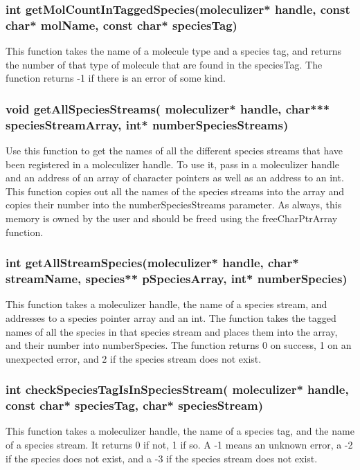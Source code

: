 \subsubsection{int getMolCountInTaggedSpecies(moleculizer* handle,
  const char* molName, const char* speciesTag)}
This function takes the name of a molecule type and a species tag, and
returns the number of that type of molecule that are found in the
speciesTag.  The function returns -1 if there is an error of some
kind.  

\subsubsection{void getAllSpeciesStreams( moleculizer* handle, char***
  speciesStreamArray, int* numberSpeciesStreams)}
Use this function to get the names of all the different species
streams that have been registered in a moleculizer handle.  To use it,
pass in a moleculizer handle and an address of an array of character
pointers as well as an address to an int.  This function copies out
all the names of the species streams into the array and copies their
number into the numberSpeciesStreams parameter.  As always, this
memory is owned by the user and should be freed using the
freeCharPtrArray function.  


\subsubsection{int getAllStreamSpecies(moleculizer* handle, char*
  streamName, species** pSpeciesArray, int* numberSpecies)}
This function takes a moleculizer handle, the name of a species
stream, and addresses to a species pointer array and an int.  The
function takes the tagged names of all the species in that species
stream and places them into the array, and their number into
numberSpecies.  The function returns 0 on success, 1 on an unexpected
error, and 2 if the species stream does not exist.  

\subsubsection{int checkSpeciesTagIsInSpeciesStream( moleculizer*
  handle, const char* speciesTag, char* speciesStream)}
This function takes a moleculizer handle, the name of a species
tag, and the name of a species stream.  It returns 0 if not, 1 if so.
A -1 means an unknown error, a -2 if the species does not exist, and a
-3 if the species stream does not exist.  

